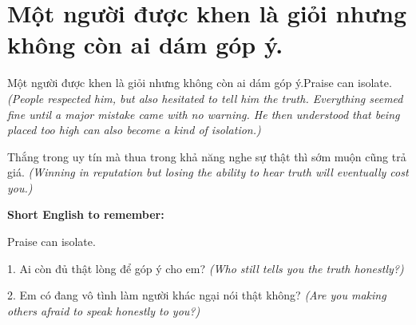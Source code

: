 \section{Một người được khen là giỏi nhưng không còn ai dám góp ý.}
\begin{truyen}{Một người được khen là giỏi nhưng không còn ai dám góp ý.}{Praise can isolate.}
\textit{(People respected him, but also hesitated to tell him the truth. Everything seemed fine until a major mistake came with no warning. He then understood that being placed too high can also become a kind of isolation.)}
\end{truyen}
\begin{baihoc}
Thắng trong uy tín mà thua trong khả năng nghe sự thật thì sớm muộn cũng trả giá.
\textit{(Winning in reputation but losing the ability to hear truth will eventually cost you.)}
\end{baihoc}
\begin{ghinhoanh}\textbf{Short English to remember:}

Praise can isolate.
\end{ghinhoanh}
\begin{tuhocnhanh}
1. Ai còn đủ thật lòng để góp ý cho em? \textit{(Who still tells you the truth honestly?)}

2. Em có đang vô tình làm người khác ngại nói thật không? \textit{(Are you making others afraid to speak honestly to you?)}
\end{tuhocnhanh}
\ngancach